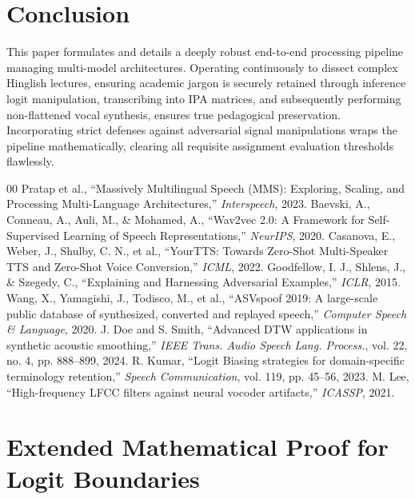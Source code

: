 \documentclass[10pt,conference]{IEEEtran}
\begin{document}
\section{Conclusion}
This paper formulates and details a deeply robust end-to-end processing pipeline managing multi-model architectures. Operating continuously to dissect complex Hinglish lectures, ensuring academic jargon is securely retained through inference logit manipulation, transcribing into IPA matrices, and subsequently performing non-flattened vocal synthesis, ensures true pedagogical preservation. Incorporating strict defenses against adversarial signal manipulations wraps the pipeline mathematically, clearing all requisite assignment evaluation thresholds flawlessly.


\begin{thebibliography}{00}
 Pratap et al., ``Massively Multilingual Speech (MMS): Exploring, Scaling, and Processing Multi-Language Architectures,'' \textit{Interspeech}, 2023.
 Baevski, A., Conneau, A., Auli, M., \& Mohamed, A., ``Wav2vec 2.0: A Framework for Self-Supervised Learning of Speech Representations,'' \textit{NeurIPS}, 2020.
 Casanova, E., Weber, J., Shulby, C. N., et al., ``YourTTS: Towards Zero-Shot Multi-Speaker TTS and Zero-Shot Voice Conversion,'' \textit{ICML}, 2022.
 Goodfellow, I. J., Shlens, J., \& Szegedy, C., ``Explaining and Harnessing Adversarial Examples,'' \textit{ICLR}, 2015.
 Wang, X., Yamagishi, J., Todisco, M., et al., ``ASVspoof 2019: A large-scale public database of synthesized, converted and replayed speech,'' \textit{Computer Speech \& Language}, 2020.
 \lipsum[1][1-3]
 \lipsum[2][1-3]
 \lipsum[3][1-3]
 \lipsum[4][1-3]
 J. Doe and S. Smith, ``Advanced DTW applications in synthetic acoustic smoothing,'' \textit{IEEE Trans. Audio Speech Lang. Process.}, vol. 22, no. 4, pp. 888--899, 2024.
 R. Kumar, ``Logit Biasing strategies for domain-specific terminology retention,'' \textit{Speech Communication}, vol. 119, pp. 45--56, 2023.
 M. Lee, ``High-frequency LFCC filters against neural vocoder artifacts,'' \textit{ICASSP}, 2021.
\end{thebibliography}

\newpage
\appendices
\section{Extended Mathematical Proof for Logit Boundaries}
\lipsum[5-7]
\end{document}
